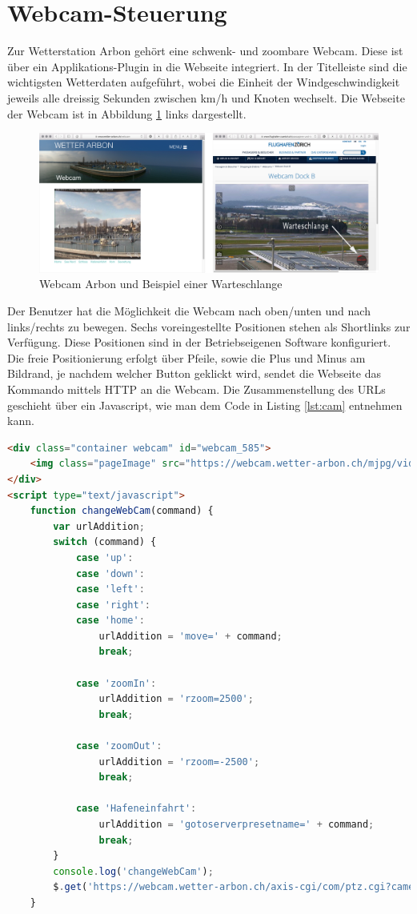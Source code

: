 \section{Webcam-Steuerung}
Zur Wetterstation Arbon gehört eine schwenk- und zoombare Webcam. Diese ist über ein Applikations-Plugin in die Webseite integriert. In der Titelleiste sind die wichtigsten Wetterdaten aufgeführt, wobei die Einheit der Windgeschwindigkeit jeweils alle dreissig Sekunden zwischen km/h und Knoten wechselt. Die Webseite der Webcam ist in Abbildung \ref{img:warteschlange} links dargestellt.

\begin{figure}[h]
	\centering
	\includegraphics[width=1\linewidth]{img/warteschlange}
	\caption{Webcam Arbon und Beispiel einer Warteschlange}
	\label{img:warteschlange}
\end{figure}


Der Benutzer hat die Möglichkeit die Webcam nach oben/unten und nach links/rechts zu bewegen. Sechs voreingestellte Positionen stehen als Shortlinks zur Verfügung. Diese Positionen sind in der Betriebseigenen Software konfiguriert. Die freie Positionierung erfolgt über Pfeile, sowie die Plus und Minus am Bildrand, je nachdem welcher Button geklickt wird, sendet die Webseite das Kommando mittels HTTP an die Webcam. Die Zusammenstellung des URLs geschieht über ein Javascript, wie man dem Code in Listing \ref{lst:cam} entnehmen kann.

\begin{lstlisting}[caption={Positionsänderung der Webcam},label={lst:cam},language=html]
 <div class="container webcam" id="webcam_585">
	<img class="pageImage" src="https://webcam.wetter-arbon.ch/mjpg/video.mjpg"/>
</div>
<script type="text/javascript">
	function changeWebCam(command) {
		var urlAddition;
		switch (command) {
			case 'up':
			case 'down':
			case 'left':
			case 'right':
			case 'home':
				urlAddition = 'move=' + command;
				break;
				
			case 'zoomIn':
				urlAddition = 'rzoom=2500';
				break;
				
			case 'zoomOut':
				urlAddition = 'rzoom=-2500';
				break;
				
			case 'Hafeneinfahrt':
				urlAddition = 'gotoserverpresetname=' + command;
				break;		
		}
		console.log('changeWebCam');
		$.get('https://webcam.wetter-arbon.ch/axis-cgi/com/ptz.cgi?camera=1&' + urlAddition);
	}
\end{lstlisting}


